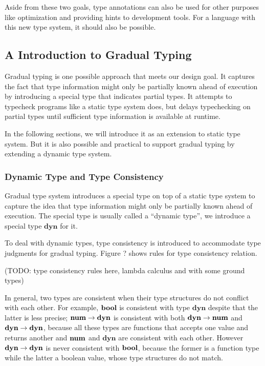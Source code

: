 Aside from these two goals, type annotations can also be used for
other purposes like optimization and providing hints to development tools.
For a language with this new type system, it should also be possible.

\subsection{A Introduction to Gradual Typing}

\newcommand{\dyn}{\textbf{dyn}}

Gradual typing is one possible approach that meets our design goal.
It captures the fact that type information might only be partially known
ahead of execution by introducing a special type that indicates partial types.
It attempts to typecheck programs like a static type system does, but delays
typechecking on partial types until sufficient type information is available
at runtime.

In the following sections, we will introduce it
as an extension to static type system.
But it is also possible and practical to support gradual typing by
extending a dynamic type system.


\subsubsection{Dynamic Type and Type Consistency}

Gradual type system introduces a special type on top of a static type system
to capture the idea that type information might only be partially known
ahead of execution.
The special type is usually called a ``dynamic type'', we introduce a special type $\dyn$ for it.

To deal with dynamic types, type consistency is introduced
to accommodate type judgments for gradual typing.
Figure ? shows rules for type consistency relation.

(TODO: type consistency rules here, lambda calculus and with some ground types)

In general, two types are consistent when
their type structures do not conflict with each other.
For example, $\textbf{bool}$ is consistent with type $\dyn$
despite that the latter is less precise;
$\tarr{\tnum}{\dyn}$ is consistent with both $\tarr{\dyn}{\tnum}$ and $\tarr{\dyn}{\dyn}$,
because all these types are functions that accepts one value and returns another and
$\textbf{num}$ and $\dyn$ are consistent with each other.
However $\tarr{\dyn}{\dyn}$ is never consistent with $\textbf{bool}$,
because the former is a function type while the latter a boolean value,
whose type structures do not match.

